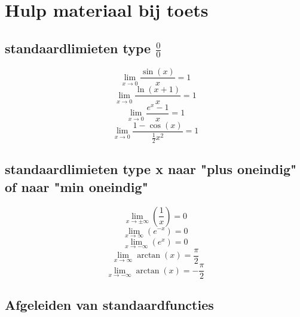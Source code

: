 \documentclass{article}
\begin{document}
\section*{Hulp materiaal bij toets}
\subsection*{standaardlimieten type $\frac{0}{0}$}
\begin{equation}
\lim_{x\to0}\frac{\sin\left(x\right)}{x}=1
\end{equation}
\begin{equation}
\lim_{x\to0}\frac{\ln\left(x+1\right)}{x}=1
\end{equation}
\begin{equation}
\lim_{x\to0}\frac{e^{x}-1}{x}=1
\end{equation}
\begin{equation}
\lim_{x\to0}\frac{1-\cos\left(x\right)}{\frac{1}{2}x^2}=1
\end{equation}
\subsection*{standaardlimieten type x naar "plus oneindig" of naar "min oneindig"}
\begin{equation}
\lim_{x\to\pm\infty}\left(\frac{1}{x}\right)=0
\end{equation}
\begin{equation}
\lim_{x\to\infty}\left(e^{-x}\right)=0
\end{equation}
\begin{equation}
\lim_{x\to-\infty}\left(e^{x}\right)=0
\end{equation}
\begin{equation}
\lim_{x\to\infty}\arctan\left(x\right)=\frac{\pi}{2}
\end{equation}
\begin{equation}
\lim_{x\to-\infty}\arctan\left(x\right)=-\frac{\pi}{2}
\end{equation}
\subsection*{Afgeleiden van standaardfuncties}
\renewcommand{\arraystretch}{2}
\end{document}
